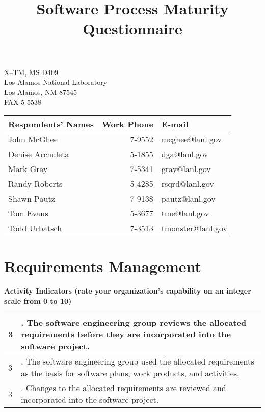 \documentclass{article}
\title{Software Process Maturity Questionnaire}
\newcommand{\KPAname}{}
\let\KPAsection=\section
\renewcommand{\section}[1]{\renewcommand{\KPAname}{#1}\KPAsection{#1}}
\newcounter{activity}		%
\newenvironment{KPAActivity}
{
    \setcounter{activity}{0} %
    {\bf Activity Indicators (rate your organization's capability
    on an integer scale from 0 to 10)} %
    \begin{center}
    \begin{tabular}{|p{0.5in}|p{6.0in}|} \hline %
}
{
    \end{tabular}
    \end{center}
}
\newcommand{\Activity}[2]
{
    \stepcounter{activity} #1 & \arabic{activity}. #2 \\ \hline
} %
\begin{document}
\maketitle
\begin{center}
\parbox{35ex}{X--TM, MS D409\\
Los Alamos National Laboratory\\
Los Alamos, NM 87545\\
FAX 5-5538\\}

\begin{tabular}{|l|r|l|} \hline
{\bf Respondents' Names} & {\bf Work Phone} & {\bf E-mail} \\ \hline
John McGhee              & 7-9552           & mcghee@lanl.gov \\
Denise Archuleta         & 5-1855           & dga@lanl.gov \\
Mark Gray                & 7-5341           & gray@lanl.gov \\
Randy Roberts            & 5-4285           & rsqrd@lanl.gov \\
Shawn Pautz              & 7-9138           & pautz@lanl.gov \\
Tom Evans                & 5-3677           & tme@lanl.gov \\
Todd Urbatsch            & 7-3513           & tmonster@lanl.gov \\ \hline
\end{tabular}
\end{center}

\newpage
\section{Requirements Management}

\begin{KPAActivity}
\Activity{3}{The software engineering group reviews the allocated
requirements before they are incorporated into the software project.}
\Activity{3}{The software engineering group used the allocated
requirements as the basis for software plans, work products, and
activities.}
\Activity{3}{Changes to the allocated requirements are reviewed and
incorporated into the software project.}
\end{KPAActivity}
\end{document}
